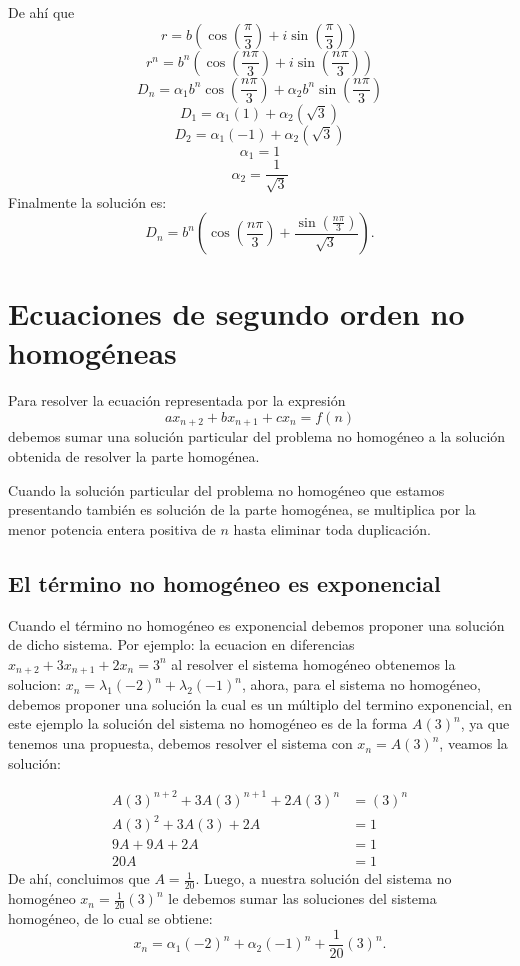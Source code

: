 \documentclass{report}
\begin{document}
De ahí que
  $$r=b(\cos(\frac{\pi}{3})+i\sin(\frac{\pi}{3}))$$
  $$r^n=b^n(\cos(\frac{n\pi}{3})+i\sin(\frac{n\pi}{3}))$$
  $$D_{n}=\alpha_{1}b^n\cos(\frac{n\pi}{3})+\alpha_{2}b^n\sin(\frac{n\pi}{3})$$
  $$D_{1}=\alpha_{1}(1)+\alpha_{2}(\sqrt{3})$$
  $$D_{2}=\alpha_{1}(-1)+\alpha_{2}(\sqrt{3})$$
  $$\alpha_{1}=1$$
  $$\alpha_{2}=\frac{1}{\sqrt{3}}$$
Finalmente la solución es:
\begin{equation}
  \label{solucion determinante}
D_{n}=b^n(\cos(\frac{n\pi}{3})+\frac{\sin(\frac{n\pi}{3})}{\sqrt{3}}).
\end{equation}


\section{Ecuaciones de segundo orden no homogéneas}
\label{sec:nohomogeneas}

Para resolver la ecuación representada por la expresión
$$ax_{n+2}+bx_{n+1}+cx_{n}=f(n)$$ debemos sumar una solución particular
del problema no homogéneo a la solución obtenida de resolver la parte
homogénea.

Cuando la solución particular del problema no homogéneo que estamos
presentando también es solución de la parte homogénea, se multiplica
por la menor potencia entera positiva de $n$ hasta eliminar toda
duplicación.

\subsection{El término no homogéneo es exponencial}
\label{sec:exponencial}

Cuando el término no homogéneo es exponencial debemos proponer una
solución de dicho sistema. Por ejemplo: la ecuacion en diferencias
$x_{n+2}+3x_{n+1}+2x_n=3^n$ al resolver el sistema homogéneo
obtenemos la solucion: $x_n=\lambda_1(-2)^n+\lambda_2(-1)^n$, ahora,
para el sistema no homogéneo, debemos proponer una solución la
cual es un múltiplo del termino exponencial, en este ejemplo la
solución del sistema no homogéneo es de la forma $A(3)^n$, ya que
tenemos una propuesta, debemos resolver el sistema con $x_n=A(3)^n$,
veamos la solución:

\begin{align*}
  A(3)^{n+2}+3A(3)^{n+1}+2A(3)^n&=(3)^n\\
  A(3)^2+3A(3)+2A&=1\\
  9A+9A+2A&=1\\
  20A&=1
\end{align*}
De ahí, concluimos que $A=\frac{1}{20}$.
Luego, a nuestra solución del sistema no homogéneo  $x_n=\frac{1}{20}(3)^n$ le debemos sumar las soluciones del sistema homogéneo, de lo cual se obtiene:
$$x_n=\alpha_1(-2)^n+\alpha_2(-1)^n+\frac{1}{20}(3)^n.$$
\end{document}
